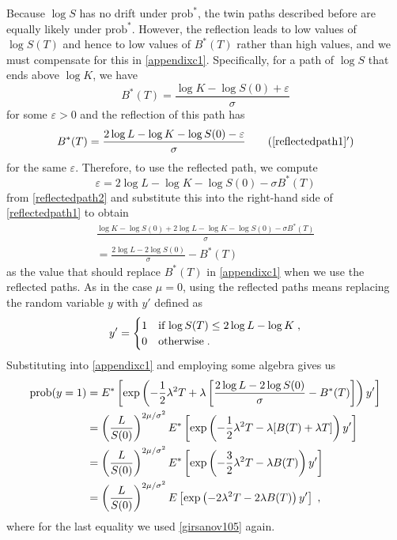 Because $\log S$ has no drift under $\text{prob}^*$, the twin paths described before are equally likely under $\text{prob}^*$.  However, the reflection leads to low values of $\log S(T)$ and hence to low values of $B^*(T)$ rather than high values, and we must compensate for this in \eqref{appendixc1}.  Specifically, for a path of $\log S$ that ends above $\log K$, we have
\begin{equation}\label{reflectedpath1}
B^*(T) = \frac{\log K - \log S(0) + \varepsilon}{\sigma}
\end{equation}
for some $\varepsilon>0$ and the reflection of this path has
\begin{equation}\label{reflectedpath2}
B^*(T) = \frac{2\log L - \log K - \log S(0) - \varepsilon}{\sigma}\tag{\ref{reflectedpath1}$'$}
\end{equation}
for the same $\varepsilon$.  Therefore, to use the reflected path, we compute 
$$\varepsilon = 2\log L - \log K - \log S(0) - \sigma B^*(T)$$
from \eqref{reflectedpath2} and substitute this into the right-hand side of \eqref{reflectedpath1} to obtain
\begin{multline*}
\frac{\log K - \log S(0) + 2\log L - \log K - \log S(0) - \sigma B^*(T)}{\sigma} \\= \frac{2\log L - 2\log S(0)}{\sigma} - B^*(T)
\end{multline*}
as the value that should replace $B^*(T)$ in  \eqref{appendixc1} when we use the reflected paths.  As in the case $\mu=0$, using the reflected paths means replacing the random variable $y$ with $y'$ defined as
$$y' = \begin{cases} 1 & \text{if $\log S(T)\leq 2 \log L - \log K$}\;,\\
0 & \text{otherwise\;.} \end{cases}$$
Substituting into  \eqref{appendixc1} and employing some algebra gives us
\begin{align}
\text{prob}(y=1) &= E^*\left[\exp\left(-\frac{1}{2}\lambda^2T + \lambda\left[\frac{2\log L - 2\log S(0)}{\sigma} - B^*(T)\right]\right)y'\right]\notag\\
&= \left(\frac{L}{S(0)}\right)^{2\mu/\sigma^2}E^*\left[\exp\left(-\frac{1}{2}\lambda^2T - \lambda [B(T)+\lambda T]\right)y'\right]\notag\\
&=\left(\frac{L}{S(0)}\right)^{2\mu/\sigma^2}E^*\left[\exp\left(-\frac{3}{2}\lambda^2T - \lambda B(T)\right)y'\right]\notag\\
&= \left(\frac{L}{S(0)}\right)^{2\mu/\sigma^2}E\left[\exp\left(-2\lambda^2T - 2\lambda B(T)\right)y'\right]\;,\label{appendixc200}
\end{align}
where for the last equality we used  \eqref{girsanov105} again.

